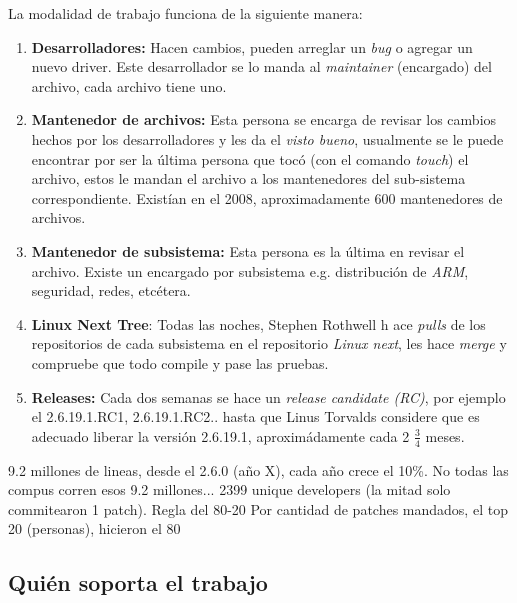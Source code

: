 \documentclass[spanish]{article}
\begin{document}
La modalidad de trabajo funciona de la siguiente manera:
\begin{enumerate}
	\item \textbf{Desarrolladores:} Hacen cambios, pueden arreglar un \textit{bug} o agregar un nuevo driver. Este desarrollador se lo manda al \textit{maintainer} (encargado) del archivo, cada archivo tiene uno.

	\item \textbf{Mantenedor de archivos:} Esta persona se encarga de revisar los cambios hechos por los desarrolladores y les da el \textit{visto bueno}, usualmente se le puede encontrar por ser la \'{u}ltima persona que toc\'{o} (con el comando \textit{touch}) el archivo, estos le mandan el archivo a los mantenedores del sub-sistema correspondiente. Exist\'{i}an en el 2008, aproximadamente 600 mantenedores de archivos.

	\item \textbf{Mantenedor de subsistema: } Esta persona es la \'{u}ltima en revisar el archivo. Existe un encargado por subsistema e.g. distribuci\'{o}n de \textit{ARM}, seguridad, redes, etc\'{e}tera.
	
	\item \textbf{Linux Next Tree}: Todas las noches, Stephen Rothwell h ace \textit{pulls} de los repositorios de cada subsistema en el repositorio \textit{Linux next}, les hace \textit{merge} y compruebe que todo compile y pase las pruebas.
	
	\item \textbf{Releases: } Cada dos semanas se hace un \textit{release candidate (RC)}, por ejemplo el 2.6.19.1.RC1, 2.6.19.1.RC2.. hasta que Linus Torvalds considere que es adecuado liberar la versi\'{o}n 2.6.19.1, aproxim\'{a}damente cada 2 $\frac{3}{4}$ meses.
\end{enumerate}

9.2 millones de lineas, desde el 2.6.0 (año X), cada año crece el 10\%. No todas las compus corren esos 9.2 millones... 2399 unique developers (la mitad solo commitearon 1 patch). Regla del 80-20 Por cantidad de patches mandados, el top 20 (personas), hicieron el 80%

\subsection{Qui\'{e}n soporta el trabajo}
\end{document}
